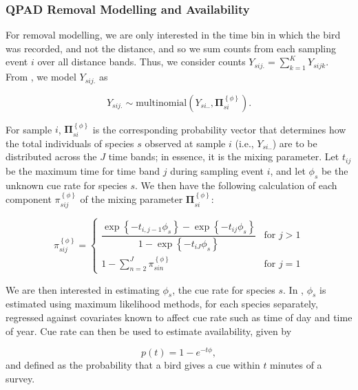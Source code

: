 \documentclass[12pt]{article}
\begin{document}
\subsubsection{QPAD Removal Modelling and Availability}
\par For removal modelling, we are only interested in the time bin in which the bird was recorded, and not the distance, and so we sum counts from each sampling event $i$ over all distance bands. 
Thus, we consider counts $Y_{sij.} = \sum_{k=1}^{K}{Y}_{sijk}$. 
From \citet{solymos_calibrating_2013}, we model $Y_{sij.}$ as

$${Y}_{sij.} \sim \mathrm{multinomial}\left({Y}_{si..}, \mathbf{\Pi}_{si}^{\left\{\phi\right\}}\right).$$

\par For sample $i$, $\mathbf{\Pi}_{si}^{\left\{\phi\right\}}$ is the corresponding probability vector that determines how the total individuals of species $s$ observed at sample $i$ (i.e., ${Y}_{si..}$) are to be distributed across the $J$ time bands; in essence, it is the mixing parameter.
Let $t_{ij}$ be the maximum time for time band $j$ during sampling event $i$, and let $\phi_s$ be the unknown cue rate for species $s$.
We then have the following calculation of each component $\pi_{sij}^{\left\{\phi\right\}}$ of the mixing parameter $\mathbf{\Pi}_{si}^{\left\{\phi\right\}}$:

\begin{equation}\label{eq:removal}
	\pi_{sij}^{\left\{\phi\right\}} = 
	\begin{cases}
		\dfrac{\exp\left\{ -t_{i,j-1}\phi_{s} \right\} - \exp\left\{ -t_{ij}\phi_{s} \right\}}{1 - \exp\left\{ -t_{iJ}\phi_{s} \right\}} & \text{for } j > 1 \\
		1 - \sum_{n = 2}^{J} \pi_{sin}^{\left\{\phi\right\}} & \text{for } j = 1
	\end{cases}
\end{equation}

\par We are then interested in estimating $\phi_s$, the cue rate for species $s$.
In \citet{solymos_calibrating_2013}, $\phi_s$ is estimated using maximum likelihood methods, for each species separately, regressed against covariates known to affect cue rate such as time of day and time of year.
Cue rate can then be used to estimate availability, given by

\begin{equation}\label{eq:availability}
	p(t) = 1 - e^{-t\phi},
\end{equation}
and defined as the probability that a bird gives a cue within $t$ minutes of a survey.
\end{document}
